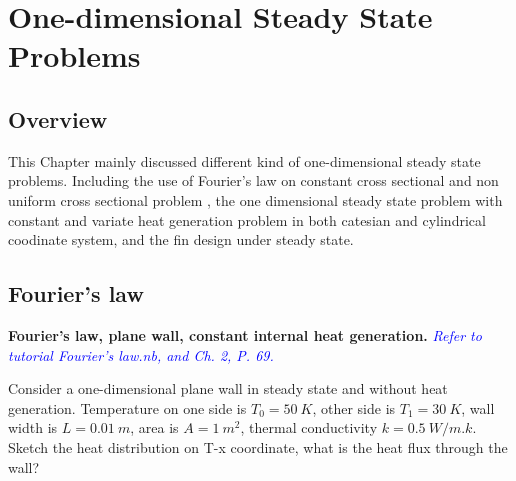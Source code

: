 \newtheorem{problem}{Problem}[section]

\chapter{One-dimensional Steady State Problems}

\section{Overview}
This Chapter mainly discussed different kind of one-dimensional steady state problems. Including the use of Fourier’s law on constant cross sectional and non uniform cross sectional problem , the one dimensional steady state problem with constant and variate heat generation problem in both catesian and cylindrical coodinate system, and the fin design under steady state.

\section{Fourier's law}

\begin{example}
\textbf{Fourier’s law, plane wall, constant internal heat
generation.} \textcolor{blue} {\emph{Refer to tutorial Fourier’s
law.nb, and Ch. 2, P. 69.}}

Consider a one-dimensional plane wall in steady state and without heat generation.
Temperature on one side is $T_0=50~K$, other side is $T_1=30~K$, wall width is $L=0.01~m$,
area is $A=1~m^2$, thermal conductivity $k=0.5~W/m.k$. Sketch the heat distribution on T-x coordinate,
what is the heat flux  through the wall?
\end{example}

